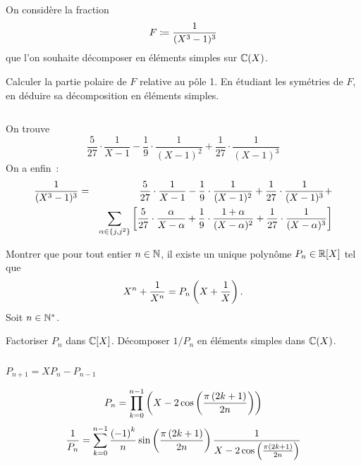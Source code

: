 \documentclass{magnolia}
\begin{document}
On considère la fraction
\[F\coloneqq\frac{1}{(X^3-1)^3}\]
que l'on souhaite décomposer en éléments simples sur $\fracC$.
\begin{questions}
\question Calculer la partie polaire de $F$ relative au pôle 1.
\question En étudiant les symétries de $F$, en déduire sa décomposition en
  éléments simples.
\end{questions}
\begin{sol}
$\quad$
\begin{questions}
\question On trouve
  \[\frac{5}{27}\cdot\frac{1}{X-1}-\frac{1}{9}\cdot\frac{1}{(X-1)^2}
    +\frac{1}{27}\cdot\frac{1}{(X-1)^3}\]
\question On a enfin~:
  \begin{eqnarray*}
  \frac{1}{(X^3-1)^3}&=&
    \frac{5}{27}\cdot\frac{1}{X-1}-\frac{1}{9}\cdot\frac{1}{(X-1)^2}
    +\frac{1}{27}\cdot\frac{1}{(X-1)^3}+\\
    &&\sum_{\alpha\in\left\{j,j^2\right\}}\left[
    \frac{5}{27}\cdot\frac{\alpha}{X-\alpha}+\frac{1}{9}\cdot\frac{1+\alpha}{(X-\alpha)^2}
    +\frac{1}{27}\cdot\frac{1}{(X-\alpha)^3}\right]
  \end{eqnarray*}
\end{questions}
\end{sol}




\begin{questions}
\question Montrer que pour tout entier $n\in\mathbb{N}$, il existe un unique polynôme
  $P_n\in\polyR$ tel que
  \[X^n+\frac{1}{X^n}=P_n\left(X+\frac{1}{X}\right).\]
\question Soit $n\in{\mathbb{N}^*}$.
  \begin{questions}
  \question Factoriser $P_n$ dans $\polyC$.
  \question Décomposer $1/P_n$ en éléments simples dans $\fracC$.
  \end{questions}
\end{questions}
\begin{sol}
$\quad$
\begin{questions}
\question $P_{n+1}=XP_n-P_{n-1}$
\question
  \begin{questions}
  \question 
    \[P_n=\prod_{k=0}^{n-1} \left(X-2\cos\left(\frac{\pi\left(2k+1\right)}{2n}\right)\right)\]
  \question
    \[\frac{1}{P_n}=\sum_{k=0}^{n-1} \frac{\left(-1\right)^k}{n}\sin\left(\frac{\pi\left(2k+1\right)}{2n}\right)
      \frac{1}{X-2\cos\left(\frac{\pi\left(2k+1\right)}{2n}\right)}\]
  \end{questions}
\end{questions}
\end{sol}
\end{document}
